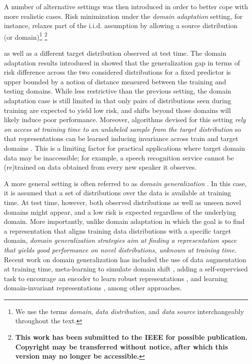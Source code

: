 \documentclass{article}
\newcommand\blfootnote[1]{\begingroup
  \renewcommand\thefootnote{}\footnote{#1}\addtocounter{footnote}{-1}\endgroup
}
\begin{document}
A number of alternative settings was then introduced in order to better cope with more realistic cases. Risk minimization under the \emph{domain adaptation} setting, for instance, relaxes part of the i.i.d. assumption by allowing a source distribution (or domain)\footnote{We use the terms \textit{domain}, \textit{data distribution}, and \textit{data source}  interchangeably throughout the text.} \blfootnote{\textbf{This work has been submitted to the IEEE for possible publication. Copyright may be transferred without notice, after which this version may no longer be accessible.}} as well as a different target distribution observed at test time. The domain adaptation results introduced in \cite{ben2007analysis} showed that the generalization gap in terms of risk difference across the two considered distributions for a fixed predictor is upper bounded by a notion of distance measured between the training and testing domains. While less restrictive than the previous setting, the domain adaptation case is still limited in that only pairs of distributions seen during training are expected to yield low risk, and shifts beyond those domains will likely induce poor performance. Moreover, algorithms devised for this setting \emph{rely on access at training time to an unlabeled sample from the target distribution} so that representations can be learned inducing invariance across train and target domains \cite{ganin2016domain}. This is a limiting factor for practical applications where target domain data may be inaccessible; for example, a speech recognition service cannot be (re)trained on data obtained from every new speaker it observes.

A more general setting is often referred to as \textit{domain generalization} \cite{muandet2013domain}. In this case, it is assumed that a set of distributions over the data is available at training time. At test time, however, both observed distributions as well as unseen novel domains might appear, and a low risk is expected regardless of the underlying domain. More importantly, unlike domain adaptation in which the goal is to find a representation that aligns training data distributions with a specific target domain, \emph{domain generalization strategies aim at finding a representation space that yields good performance on novel distributions, unknown at training time.} Recent work on domain generalization has included the use of data augmentation \cite{shankar2018generalizing, volpi2018generalizing} at training time, meta-learning to simulate domain shift \cite{li2018learning}, adding a self-supervised task to encourage an encoder to learn robust representations \cite{carlucci2019domain, albuquerque2020improving}, and  learning domain-invariant representations \cite{li2018deep}, among other approaches.
\end{document}
